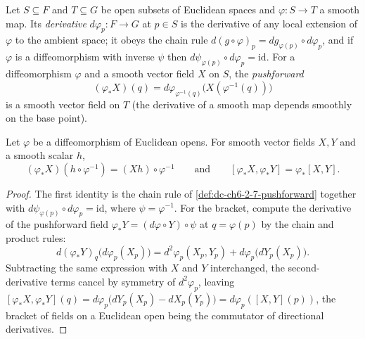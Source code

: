 \begin{definition}
  \label{def:dc-ch6-2-7-pushforward}
  \leanok
  Let $S\subseteq F$ and $T\subseteq G$ be open subsets of Euclidean spaces and
  $\varphi:S\to T$ a smooth map. Its \emph{derivative} $d\varphi_p:F\to G$ at
  $p\in S$ is the derivative of any local extension of $\varphi$ to the
  ambient space; it obeys the chain rule
  $d(g\circ\varphi)_p=dg_{\varphi(p)}\circ d\varphi_p$, and if $\varphi$ is a
  diffeomorphism with inverse $\psi$ then
  $d\psi_{\varphi(p)}\circ d\varphi_p=\mathrm{id}$. For a diffeomorphism
  $\varphi$ and a smooth vector field $X$ on $S$, the \emph{pushforward}
  $$
  (\varphi_*X)(q)=d\varphi_{\varphi^{-1}(q)}\bigl(X(\varphi^{-1}(q))\bigr)
  $$
  is a smooth vector field on $T$ (the derivative of a smooth map depends
  smoothly on the base point).
\end{definition}

\begin{lemma}
  \label{lem:dc-ch6-2-7-pushforward-naturality}
  \leanok
  Let $\varphi$ be a diffeomorphism of Euclidean opens. For smooth vector
  fields $X,Y$ and a smooth scalar $h$,
  $$
  (\varphi_*X)(h\circ\varphi^{-1})=(Xh)\circ\varphi^{-1}
  \qquad\text{and}\qquad
  [\varphi_*X,\varphi_*Y]=\varphi_*[X,Y].
  $$
\end{lemma}
\begin{proof}
  \leanok
  \sketch
  The first identity is the chain rule of \cref{def:dc-ch6-2-7-pushforward}
  together with $d\psi_{\varphi(p)}\circ d\varphi_p=\mathrm{id}$, where
  $\psi=\varphi^{-1}$. For the bracket, compute the derivative of the
  pushforward field $\varphi_*Y=(d\varphi\circ Y)\circ\psi$ at
  $q=\varphi(p)$ by the chain and product rules:
  $$
  d(\varphi_*Y)_q\bigl(d\varphi_p(X_p)\bigr)
    = d^2\varphi_p(X_p,Y_p)+d\varphi_p\bigl(dY_p(X_p)\bigr).
  $$
  Subtracting the same expression with $X$ and $Y$ interchanged, the
  second-derivative terms cancel by symmetry of $d^2\varphi_p$,
  leaving
  $[\varphi_*X,\varphi_*Y](q)
    =d\varphi_p\bigl(dY_p(X_p)-dX_p(Y_p)\bigr)=d\varphi_p([X,Y](p))$,
  the bracket of fields on a Euclidean open being the commutator of directional
  derivatives.
\end{proof}

